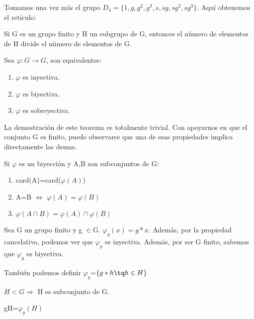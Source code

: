 \documentclass[a4paper,10pt]{apuntes}
\newenvironment{example}[1][Ejemplo]{\begin{trivlist}
\item[\hskip \labelsep {\bfseries #1}]}{\end{trivlist}}
\newenvironment{notacion}[1][Notación:]{\begin{trivlist}
\item[\hskip \labelsep {\bfseries #1}]}{\end{trivlist}}
\begin{document}
  \begin{example}
   Tomamos una vez más el grupo $D_{4}=\{1,g,g^{2}, g^{3}, s, sg, sg^{2}, sg^{3}\}$. Aquí obtenemos el retículo:
  \end{example}

  \begin{theorem}
   Si G es un grupo finito y H un subgrupo de G, entonces el número de elementos de H divide el número de elementos de G.
  \end{theorem}
  \begin{lemma}
   Sea $\varphi: G\rightarrow G$, son equivalentes:
   \begin{enumerate}
    \item $\varphi$  es inyectiva.
    \item $\varphi$  es biyectiva.
    \item $\varphi$  es sobreyectiva.
   \end{enumerate}
  \end{lemma}
  La demostración de este teorema es totalmente trivial. Con apoyarnos en que el conjunto G es finito, puede observarse que una de
  esas propiedades implica directamente las demas.
  
  \begin{lemma}
   Si $\varphi$  es un biyección y A,B son subconjuntos de G:
   \begin{enumerate}
    \item card(A)=card($\varphi(A)$)
    \item A=B $\Leftrightarrow$  $\varphi(A)=\varphi(B)$
    \item $\varphi(A\cap B)=\varphi(A)\cap\varphi(B)$
   \end{enumerate}
  \end{lemma}
  
  \begin{lemma}
   Sea G un grupo finito y g $\in$G. $\varphi_{g}(x)=g*x$. Además, por la propiedad cancelativa, podemos ver que $\varphi_{g}$ es inyectiva.
   Además, por ser G finito, sabemos que $\varphi_{g}$  es biyectiva.
  \end{lemma}
  También podemos definir $\varphi_{g}$=$\{g*h\tq h\in H\}$
  \begin{lemma}
   $H<G\Rightarrow$  H es subconjunto de G.
  \end{lemma}
  
  \begin{notacion}
   gH=$\varphi_{g}(H)$
  \end{notacion}
\end{document}
